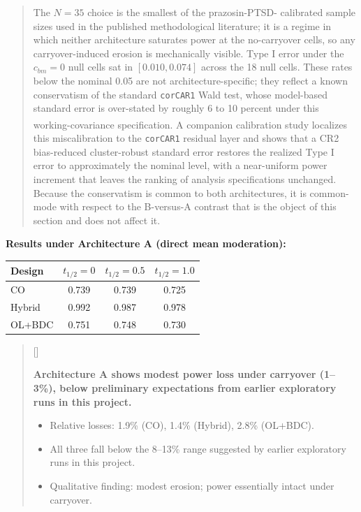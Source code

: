 \documentclass[
  11pt,
]{article}
\newcounter{pgraph}
\newenvironment{bullets}{%
  \stepcounter{pgraph}%
  \begin{quote}\small\sffamily\color[gray]{0.30}%
  {\normalfont\scriptsize\color[gray]{0.58}[\thepgraph]\enspace}}{%
  \end{quote}}
\newenvironment{orig}{%
  \begin{quote}\normalsize\color[gray]{0.55}}{%
  \end{quote}}
\begin{document}
\begin{orig}
The \(N = 35\) choice is the smallest of the prazosin-PTSD- calibrated
sample sizes used in the published methodological literature; it is a
regime in which neither architecture saturates power at the no-carryover
cells, so any carryover-induced erosion is mechanically visible. Type I
error under the \(c_{bm} = 0\) null cells sat in \([0.010, 0.074]\)
across the 18 null cells. These rates below the nominal 0.05 are not
architecture-specific; they reflect a known conservatism of the standard
\texttt{corCAR1} Wald test, whose model-based standard error is
over-stated by roughly 6 to 10 percent under this working-covariance
specification. A companion calibration
study\textsuperscript{} localizes
this miscalibration to the \texttt{corCAR1} residual layer and shows
that a CR2 bias-reduced cluster-robust standard error restores the
realized Type I error to approximately the nominal level, with a
near-uniform power increment that leaves the ranking of analysis
specifications unchanged. Because the conservatism is common to both
architectures, it is common-mode with respect to the B-versus-A contrast
that is the object of this section and does not affect it.

\end{orig}

\textbf{Results under Architecture A (direct mean moderation):}

\begin{table}[htbp]
\centering
\begin{tabular}{lccc}
\toprule
Design & $t_{1/2} = 0$ & $t_{1/2} = 0.5$ & $t_{1/2} = 1.0$ \\
\midrule
CO & 0.739 & 0.739 & 0.725 \\
Hybrid & 0.992 & 0.987 & 0.978 \\
OL+BDC & 0.751 & 0.748 & 0.730 \\
\bottomrule
\end{tabular}
\end{table}

\begin{bullets}

\textbf{Architecture A shows modest power loss under carryover
(1--3\%), below preliminary expectations from earlier exploratory
runs in this project.}

\begin{itemize}\setlength{\itemsep}{2pt}\setlength{\parskip}{0pt}
\item Relative losses: 1.9\% (CO), 1.4\% (Hybrid), 2.8\%
  (OL+BDC).
\item All three fall below the 8--13\% range suggested by earlier
  exploratory runs in this project.
\item Qualitative finding: modest erosion; power essentially
  intact under carryover.
\end{itemize}

\end{bullets}
\end{document}
